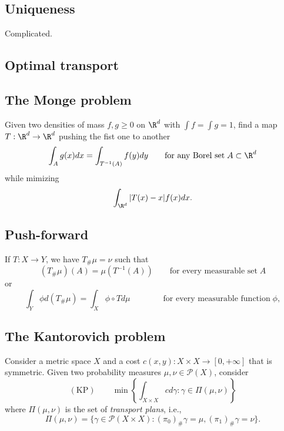 \subsection{Uniqueness}
Complicated.

\subsection{Optimal transport}

\subsection{The Monge problem}
Given two densities of mass $f,g\geq 0$ on $\R^d$ with $\int f = \int g = 1$, find a map $T:\R^d\to \R^d$ pushing the fist one to another
\begin{equation*}
    \int_A g(x)dx = \int_{T^{-1}(A)} f(y)dy \qquad\text{for any Borel set}\;A\subset\R^d
\end{equation*}
while mimizing
\begin{equation*}
    \int_{\R^d} |T(x)-x|f(x)dx.
\end{equation*}
\subsection{Push-forward}
If $T:X\to Y$, we have $T_\#\mu = \nu$ such that
\begin{equation*}
    (T_\#\mu)(A) = \mu(T^{-1}(A)) \qquad\text{for every measurable set}\;A
\end{equation*}
or
\begin{equation*}
    \int_Y \phi d(T_\#\mu) = \int_X \phi\circ T d\mu \qquad \qquad\text{for every measurable function}\;\phi,
\end{equation*}

\subsection{The Kantorovich problem}
Consider a metric space $X$ and a cost $c(x,y):X\times X\to [0,+\infty]$ that is symmetric. Given two probability measures $\mu, \nu\in \mathcal{P}(X)$, consider
\begin{equation*}
    \mathrm{(KP)}\qquad \min \left\lbrace  \int_{X\times X} cd\gamma: \gamma\in \Pi(\mu, \nu)\right\rbrace
\end{equation*}
where $\Pi(\mu, \nu)$ is the set of \emph{transport plans}, i.e.,
\begin{equation*}
    \Pi(\mu, \nu) = \{\gamma\in \mathcal{P}(X\times X): (\pi_0)_\#\gamma = \mu, (\pi_1)_\#\gamma = \nu\}. 
\end{equation*}

